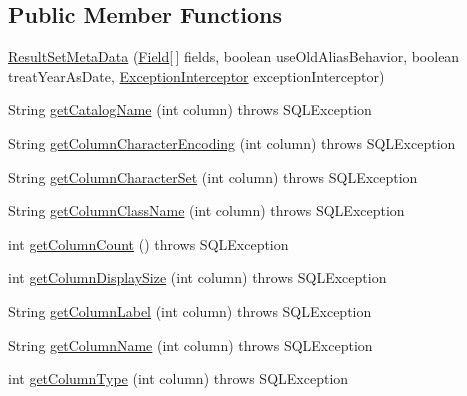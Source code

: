 \subsection*{Public Member Functions}
\begin{DoxyCompactItemize}
\item 
\mbox{\hyperlink{classcom_1_1mysql_1_1jdbc_1_1_result_set_meta_data_a86e45ca80e9e4c95104a02e545ca60d6}{Result\+Set\+Meta\+Data}} (\mbox{\hyperlink{classcom_1_1mysql_1_1jdbc_1_1_field}{Field}}\mbox{[}$\,$\mbox{]} fields, boolean use\+Old\+Alias\+Behavior, boolean treat\+Year\+As\+Date, \mbox{\hyperlink{interfacecom_1_1mysql_1_1jdbc_1_1_exception_interceptor}{Exception\+Interceptor}} exception\+Interceptor)
\item 
String \mbox{\hyperlink{classcom_1_1mysql_1_1jdbc_1_1_result_set_meta_data_ac2f12bbb6c31b08fd76a5a7a76801542}{get\+Catalog\+Name}} (int column)  throws S\+Q\+L\+Exception 
\item 
String \mbox{\hyperlink{classcom_1_1mysql_1_1jdbc_1_1_result_set_meta_data_a92e9d337ceb0d64f40d1d4045f8e580c}{get\+Column\+Character\+Encoding}} (int column)  throws S\+Q\+L\+Exception 
\item 
String \mbox{\hyperlink{classcom_1_1mysql_1_1jdbc_1_1_result_set_meta_data_acaf0893c65c1ddcbf1fffdec5a2c011a}{get\+Column\+Character\+Set}} (int column)  throws S\+Q\+L\+Exception 
\item 
String \mbox{\hyperlink{classcom_1_1mysql_1_1jdbc_1_1_result_set_meta_data_af666c44dbef9b1dd62cdd4710807f34d}{get\+Column\+Class\+Name}} (int column)  throws S\+Q\+L\+Exception 
\item 
int \mbox{\hyperlink{classcom_1_1mysql_1_1jdbc_1_1_result_set_meta_data_ad0b42106871ff26619d003a63fdff531}{get\+Column\+Count}} ()  throws S\+Q\+L\+Exception 
\item 
int \mbox{\hyperlink{classcom_1_1mysql_1_1jdbc_1_1_result_set_meta_data_af69e95164eddfe6ae48d883703133485}{get\+Column\+Display\+Size}} (int column)  throws S\+Q\+L\+Exception 
\item 
String \mbox{\hyperlink{classcom_1_1mysql_1_1jdbc_1_1_result_set_meta_data_a7915a4d0be8c46d029d9b4ca1673bbd9}{get\+Column\+Label}} (int column)  throws S\+Q\+L\+Exception 
\item 
String \mbox{\hyperlink{classcom_1_1mysql_1_1jdbc_1_1_result_set_meta_data_a3d9e5968e455f0ab1e8ffc2263b19e0b}{get\+Column\+Name}} (int column)  throws S\+Q\+L\+Exception 
\item 
int \mbox{\hyperlink{classcom_1_1mysql_1_1jdbc_1_1_result_set_meta_data_a02c543ac124aef56d0266da247510a91}{get\+Column\+Type}} (int column)  throws S\+Q\+L\+Exception 

\end{DoxyCompactItemize}
